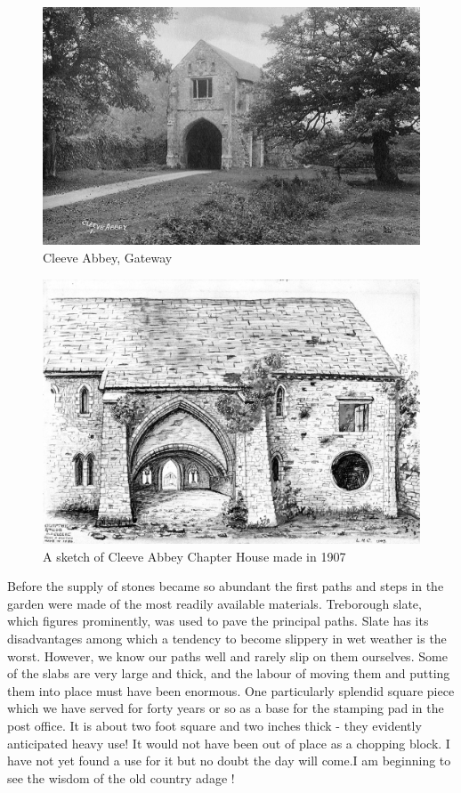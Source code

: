\begin{figure}[p]
	\centering
     \includegraphics[width=1\textwidth]{figures/CleeveAbbey}
     \caption{Cleeve Abbey, Gateway}
     \label{fig:CleeveAbbey}
\end{figure}

\begin{figure}[p]
	\centering
     \includegraphics[width=1\textwidth]{figures/ChapterHouse}
     \caption{A sketch of Cleeve Abbey Chapter House made in 1907}
     \label{fig:ChapterHouse}
\end{figure}

\afterpage{\clearpage}

Before the supply of stones became so abundant the first paths and steps in the garden were made of the most readily available materials. Treborough slate, which figures prominently, was used to pave the principal paths. Slate has its disadvantages among which a tendency to become slippery in wet weather is the worst. However, we know our paths well and rarely slip on them ourselves. Some of the slabs are very large and thick, and the labour of moving them and putting them into place must have been enormous. One particularly splendid square piece which we have served for forty years or so as a base for the stamping pad in the post office. It is about two foot square and two inches thick - they evidently anticipated heavy use! It would not have been out of place as a chopping block. I have not yet found a use for it but no doubt the day will come.I am beginning to see the wisdom of the old country adage !

